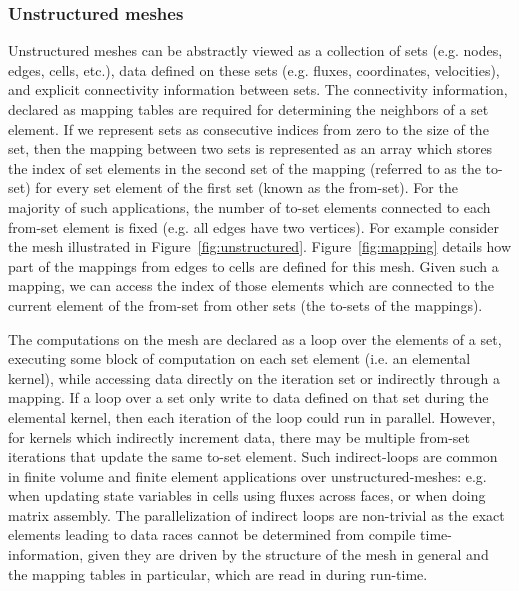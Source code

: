\subsubsection{Unstructured meshes}\label{unstructured-meshes}

\noindent Unstructured meshes can be abstractly viewed as a collection of sets 
(e.g. nodes, edges, cells, etc.), data defined on these sets (e.g. fluxes, 
coordinates, velocities), and explicit connectivity information between 
sets. The connectivity information, declared as mapping tables are required for 
determining the neighbors of a set element. If we represent sets as consecutive 
indices from zero to the size of the set, then the mapping between two 
sets is represented as an array which stores the index of set elements in the 
second set of the mapping (referred to as the to-set) for every set element of 
the first set (known as the from-set). For the majority of such applications, the number of to-set elements connected to each from-set element is fixed (e.g. all edges have two vertices). For example consider the mesh illustrated 
in Figure~\ref{fig:unstructured}. Figure~\ref{fig:mapping} details how part of 
the mappings from edges to cells are defined for this mesh. Given such a 
mapping, we can access the index of those elements which are connected to the 
current element of the from-set from other sets (the to-sets of the mappings). 

The computations on the mesh are declared as a loop over the elements of a set, 
executing some block of computation on each set element (i.e. an elemental kernel), 
while accessing data directly on the iteration set or indirectly through a 
mapping.  If a loop over a set only write to data defined on that set during the 
elemental kernel, then each iteration of the loop could run in parallel. 
However, for kernels which indirectly increment data, there may be multiple 
from-set iterations that update the same to-set element. Such indirect-loops are 
common in finite volume and finite element applications over 
unstructured-meshes: e.g. when updating state variables in cells using fluxes 
across faces, or when doing matrix assembly. The parallelization of indirect 
loops are non-trivial as the exact elements leading to data races cannot be 
determined from compile time-information, given they are driven by the 
structure of the mesh in general and the mapping tables in particular, which are 
read in during run-time. 



